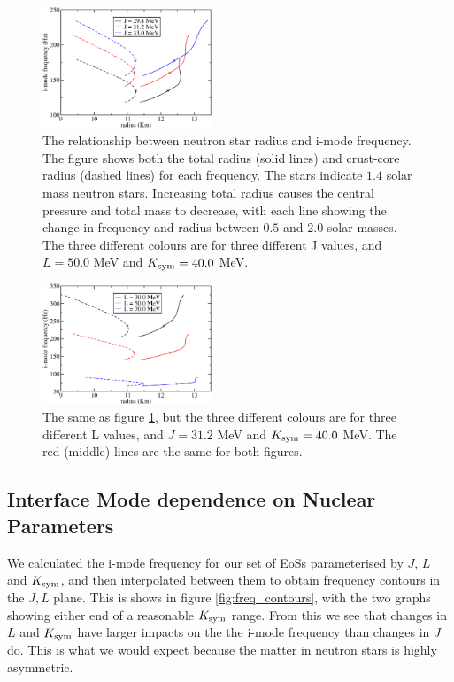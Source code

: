 \documentclass[fleqn,usenatbib]{mnras}
\begin{document}
\begin{figure}
\centering
\includegraphics[width=0.45\textwidth,angle=0]{f_Rcc_Rstar_Jvary.pdf}
\caption{The relationship between neutron star radius and i-mode frequency. The figure shows both the total radius (solid lines) and crust-core radius (dashed lines) for each frequency. The stars indicate $1.4$ solar mass neutron stars. Increasing total radius causes the central pressure and total mass to decrease, with each line showing the change in frequency and radius between $0.5$ and $2.0$ solar masses. The three different colours are for three different J values, and $L=50.0$ MeV and $K_{\rm sym}=40.0$ MeV.}
\label{fig:f_vs_R_varyJ}
\end{figure}

\begin{figure}
\centering
\includegraphics[width=0.45\textwidth,angle=0]{f_Rcc_Rstar_Lvary.pdf}
\caption{The same as figure \ref{fig:f_vs_R_varyJ}, but the three different colours are for three different L values, and $J=31.2$ MeV and $K_{\rm sym}=40.0$ MeV. The red (middle) lines are the same for both figures.}
\label{fig:f_vs_R_varyL}
\end{figure}


















\subsection{Interface Mode dependence on Nuclear Parameters}
\hspace{\parindent}We calculated the i-mode frequency for our set of EoSs parameterised by $J$, $L$ and $K_{\rm sym}$, and then interpolated between them to obtain frequency contours in the $J,L$ plane. This is shows in figure \ref{fig:freq_contours}, with the two graphs showing either end of a reasonable $K_{\rm sym}$ range. From this we see that changes in $L$ and $K_{\rm sym}$ have larger impacts on the the i-mode frequency than changes in $J$ do. This is what we would expect because the matter in neutron stars is highly asymmetric.
\end{document}
